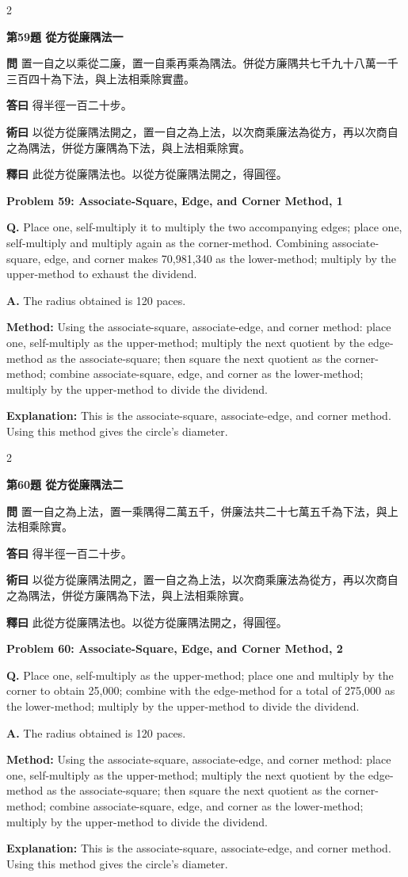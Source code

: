 \documentclass[11pt,a4paper]{article}
\newcommand{\wen}[1]{\noindent\textbf{問} #1\par\smallskip}
\newcommand{\da}[1]{\noindent\textbf{答曰} #1\par\smallskip}
\newcommand{\shu}[1]{\noindent\textbf{術曰} #1\par\smallskip}
\newcommand{\shi}[1]{\noindent\textbf{釋曰} #1\par\smallskip}
\newcommand{\wenE}[1]{\noindent\textbf{Q.} #1\par\smallskip}
\newcommand{\daE}[1]{\noindent\textbf{A.} #1\par\smallskip}
\newcommand{\shuE}[1]{\noindent\textbf{Method:} #1\par\smallskip}
\newcommand{\shiE}[1]{\noindent\textbf{Explanation:} #1\par\smallskip}
\begin{document}
\bigskip

\begin{paracol}{2}

\noindent\textbf{第59題 從方從廉隅法一}

\wen{置一自之以乘從二廉，置一自乘再乘為隅法。併從方廉隅共七千九十八萬一千三百四十為下法，與上法相乘除實盡。}
\da{得半徑一百二十步。}
\shu{以從方從廉隅法開之，置一自之為上法，以次商乘廉法為從方，再以次商自之為隅法，併從方廉隅為下法，與上法相乘除實。}
\shi{此從方從廉隅法也。以從方從廉隅法開之，得圓徑。}

\switchcolumn

\noindent\textbf{Problem 59: Associate-Square, Edge, and Corner Method, 1}

\wenE{Place one, self-multiply it to multiply the two accompanying edges; place one, self-multiply and multiply again as the corner-method. Combining associate-square, edge, and corner makes 70,981,340 as the lower-method; multiply by the upper-method to exhaust the dividend.}
\daE{The radius obtained is 120 paces.}
\shuE{Using the associate-square, associate-edge, and corner method: place one, self-multiply as the upper-method; multiply the next quotient by the edge-method as the associate-square; then square the next quotient as the corner-method; combine associate-square, edge, and corner as the lower-method; multiply by the upper-method to divide the dividend.}
\shiE{This is the associate-square, associate-edge, and corner method. Using this method gives the circle's diameter.}

\end{paracol}

\bigskip

\begin{paracol}{2}

\noindent\textbf{第60題 從方從廉隅法二}

\wen{置一自之為上法，置一乘隅得二萬五千，併廉法共二十七萬五千為下法，與上法相乘除實。}
\da{得半徑一百二十步。}
\shu{以從方從廉隅法開之，置一自之為上法，以次商乘廉法為從方，再以次商自之為隅法，併從方廉隅為下法，與上法相乘除實。}
\shi{此從方從廉隅法也。以從方從廉隅法開之，得圓徑。}

\switchcolumn

\noindent\textbf{Problem 60: Associate-Square, Edge, and Corner Method, 2}

\wenE{Place one, self-multiply as the upper-method; place one and multiply by the corner to obtain 25,000; combine with the edge-method for a total of 275,000 as the lower-method; multiply by the upper-method to divide the dividend.}
\daE{The radius obtained is 120 paces.}
\shuE{Using the associate-square, associate-edge, and corner method: place one, self-multiply as the upper-method; multiply the next quotient by the edge-method as the associate-square; then square the next quotient as the corner-method; combine associate-square, edge, and corner as the lower-method; multiply by the upper-method to divide the dividend.}
\shiE{This is the associate-square, associate-edge, and corner method. Using this method gives the circle's diameter.}

\end{paracol}
\end{document}
